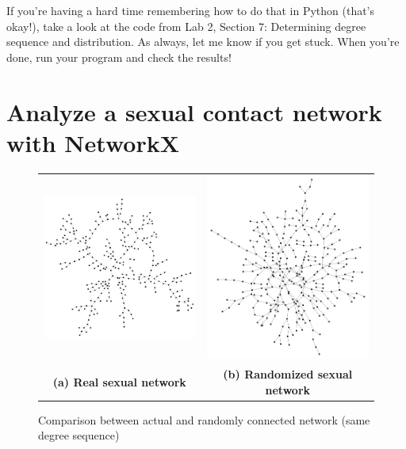 \documentclass{article}
\begin{document}
If you're having a hard time remembering how to do that in Python (that's okay!), take a look at the code from Lab 2, Section 7: Determining degree
 sequence and distribution.  As always, let me know if you get stuck.  When you're done, run your program and check the results!

\pagebreak

\section{Analyze a sexual contact network with NetworkX}

\UndefineShortVerb{\|}
\begin{figure}[!ht]

\begin{center}
\begin{tabular}{cc}
\includegraphics[width = 3in]{sexual_net.pdf} &\includegraphics[width = 3in]{shuffled_sex.pdf}\\
\textbf{(a) Real sexual network} & \textbf{(b) Randomized sexual network}\\
\end{tabular}
\caption{Comparison between actual and randomly connected network (same degree sequence)}
\label{sex_fig}
\end{center}
\end{figure}
\DefineShortVerb{\|}
\end{document}
